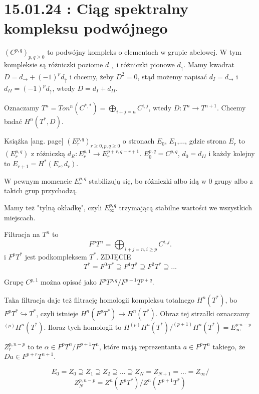 \section{15.01.24 : Ciąg spektralny kompleksu podwójnego }

$(C^{p,q})_{p,q\geq0}$ to podwójny kompleks o elementach w grupie abelowej. W tym kompleksie są różniczki poziome $d_{\to}$ i różniczki pionowe $d_{\uparrow}$. Mamy kwadrat $D=d_{\to}+(-1)^pd_{\uparrow}$ i chcemy, żeby $D^2=0$, stąd możemy napisać $d_I=d_{\to}$ i $d_{II}=(-1)^pd_{\uparrow}$, wtedy $D=d_I+d_{II}$.

  Oznaczamy $T^n=Ton^n(C^{*,*})=\bigoplus_{i+j=n} C^{i,j}$, wtedy $D:T^n\to T^{n+1}$. Chcemy badać $H^n(T^*, D)$.

    Książka [ang. page] $(E_r^{p,q})_{r\geq 0, p,q\geq 0}$ o stronach $E_0$, $E_1$,..., gdzie strona $E_r$ to $(E_r^{p,q})$ z różniczką $d_R:E_r^{p,1}\to E_r^{p+r, q-r+1}$. $E_0^{p,q}=C^{p,q}$, $d_0=d_{II}$ i każdy kolejny to $E_{r+1}=H^*(E_r, d_r)$. 

    W pewnym momencie $E_r^{p,q}$ stabilizują się, bo różniczki albo idą w $0$ grupy albo z takich grup przychodzą.

    Mamy też "tylną okładkę", czyli $E_\infty^{p,q}$ trzymającą stabilne wartości we wszystkich miejscach.

    Filtracja na $T^n$ to 
    $$F^pT^n=\bigoplus_{i+j=n, i\geq p}C^{i,j}.$$
    i $F^pT^*$ jest podkompleksem $T^*$. {\large\color{red}ZDJĘCIE}
    $$T^*=F^0T^*\supseteq F^1T^*\supseteq F^2T^*\supseteq...$$
    

    Grupę $C^{p,1}$ można opisać jako $F^pT^{p,q}/F^{p+1}T^{p+q}$.

    Taka filtracja daje też filtrację homologii kompleksu totalnego $H^n(T^*)$, bo $F^pT^*\hookrightarrow T^*$, czyli istnieje $H^n(F^pT^*)\to H^n(T^*)$. Obraz tej strzałki oznaczamy $^{(p)}H^n(T^*)$. Iloraz tych homologii to $H^{(p)}H^n(T^*)/^{(p+1)}H^n(T^*)=E^{p. n-p}_\infty$

\begin{definition}[cykle]
  $Z^{p, n-p}_r$ to te $\alpha\in F^pT^n/F^{p+1}T^n$, które mają reprezentanta $a\in F^pT^n$ takiego, że $Da\in F^{p+r}T^{n+1}$.

  \begin{center}\end{center}

  $$E_0=Z_0\supseteq Z_1\supseteq Z_2\supseteq ...\supseteq Z_N=Z_{N+1}=...=Z_\infty/$$
  $$Z_N^{p, n-p}=Z^n(F^pT^*)/Z^n(F^{p+1}T^*)$$
\end{definition}

